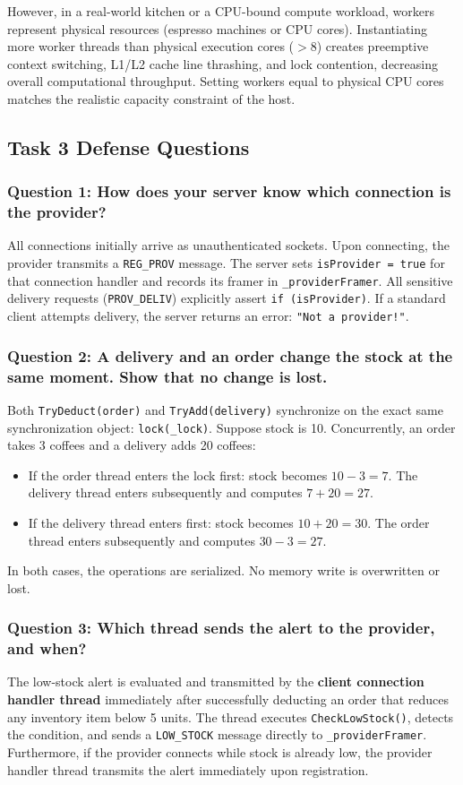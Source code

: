 \documentclass[12pt,a4paper]{article}
\begin{document}
However, in a real-world kitchen or a CPU-bound compute workload, workers represent physical resources (espresso machines or CPU cores). Instantiating more worker threads than physical execution cores ($>8$) creates preemptive context switching, L1/L2 cache line thrashing, and lock contention, decreasing overall computational throughput. Setting workers equal to physical CPU cores matches the realistic capacity constraint of the host.

\subsection{Task 3 Defense Questions}

\subsubsection{Question 1: How does your server know which connection is the provider?}
All connections initially arrive as unauthenticated sockets. Upon connecting, the provider transmits a \texttt{REG\_PROV} message. The server sets \texttt{isProvider = true} for that connection handler and records its framer in \texttt{\_providerFramer}. All sensitive delivery requests (\texttt{PROV\_DELIV}) explicitly assert \texttt{if (isProvider)}. If a standard client attempts delivery, the server returns an error: \texttt{"Not a provider!"}.

\subsubsection{Question 2: A delivery and an order change the stock at the same moment. Show that no change is lost.}
Both \texttt{TryDeduct(order)} and \texttt{TryAdd(delivery)} synchronize on the exact same synchronization object: \texttt{lock(\_lock)}.
Suppose stock is 10. Concurrently, an order takes 3 coffees and a delivery adds 20 coffees:
\begin{itemize}
    \item If the order thread enters the lock first: stock becomes $10 - 3 = 7$. The delivery thread enters subsequently and computes $7 + 20 = 27$.
    \item If the delivery thread enters first: stock becomes $10 + 20 = 30$. The order thread enters subsequently and computes $30 - 3 = 27$.
\end{itemize}
In both cases, the operations are serialized. No memory write is overwritten or lost.

\subsubsection{Question 3: Which thread sends the alert to the provider, and when?}
The low-stock alert is evaluated and transmitted by the \textbf{client connection handler thread} immediately after successfully deducting an order that reduces any inventory item below 5 units. The thread executes \texttt{CheckLowStock()}, detects the condition, and sends a \texttt{LOW\_STOCK} message directly to \texttt{\_providerFramer}. Furthermore, if the provider connects while stock is already low, the provider handler thread transmits the alert immediately upon registration.
\end{document}
